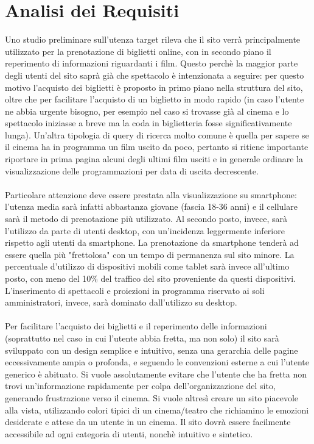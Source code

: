 \documentclass[a4paper, 12pt]{article}
\begin{document}
\section{Analisi dei Requisiti}
Uno studio preliminare sull'utenza target rileva che il sito verrà principalmente utilizzato per la prenotazione di biglietti online, con in secondo piano il reperimento di informazioni riguardanti i film.
Questo perchè la maggior parte degli utenti del sito saprà già che spettacolo è intenzionata a seguire: per questo motivo l'acquisto dei biglietti è proposto in primo piano nella struttura del sito, oltre che
per facilitare l'acquisto di un biglietto in modo rapido (in caso l'utente ne abbia urgente bisogno, per esempio nel caso si trovasse già al cinema e lo spettacolo iniziasse a breve ma la coda in biglietteria fosse significativamente lunga).
Un'altra tipologia di query di ricerca molto comune è quella per sapere se il cinema ha in programma un film uscito da poco, pertanto si ritiene importante riportare in prima pagina alcuni degli ultimi film usciti e in generale ordinare la visualizzazione delle programmazioni per data di uscita decrescente.\\\\
Particolare attenzione deve essere prestata alla visualizzazione su smartphone: l'utenza media sarà infatti abbastanza giovane (fascia 18-36 anni) e il cellulare sarà il metodo di prenotazione
più utilizzato. Al secondo posto, invece, sarà l'utilizzo da parte di utenti desktop, con un'incidenza leggermente inferiore rispetto agli utenti da smartphone.
La prenotazione da smartphone tenderà ad essere quella più "frettolosa" con un tempo di permanenza sul sito minore.
La percentuale d'utilizzo di dispositivi mobili come tablet sarà invece all'ultimo posto, con meno del 10\% del traffico del sito proveniente da questi dispositivi.
L'inserimento di spettacoli e proiezioni in programma riservato ai soli amministratori, invece, sarà dominato dall'utilizzo su desktop.\\\\
Per facilitare l'acquisto dei biglietti e il reperimento delle informazioni (soprattutto nel caso in cui l'utente abbia fretta, ma non solo) il sito sarà sviluppato con un design semplice e intuitivo,
senza una gerarchia delle pagine eccessivamente ampia o profonda, e seguendo le convenzioni esterne a cui l'utente generico è abituato.
Si vuole assolutamente evitare che l'utente che ha fretta non trovi un'informazione rapidamente per colpa dell'organizzazione del sito, generando frustrazione verso il cinema.
Si vuole altresì creare un sito piacevole alla vista, utilizzando colori tipici di un cinema/teatro che richiamino le emozioni desiderate e attese da un utente in un cinema.
Il sito dovrà essere facilmente accessibile ad ogni categoria di utenti, nonchè intuitivo e sintetico.
\end{document}
